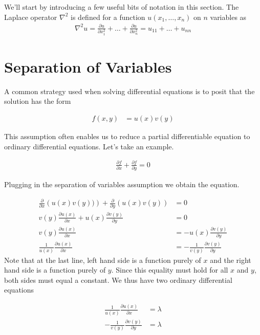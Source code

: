 \documentclass[book.tex]{subfiles}
\begin{document}
We'll start by introducing a few useful bits of notation in this section. The Laplace operator $\nabla^2$ is defined for a function $u(x_1, \dotsc, x_n)$ on $n$ variables as
\begin{align}
    \nabla^2 u = \frac{\partial u}{\partial x_1^2} + \dotsc + \frac{\partial u}{\partial x_n^2} = u_{11} + \dotsc + u_{nn}
\end{align}




\section{Separation of Variables}

A common strategy used when solving differential equations is to posit that the solution has the form

\begin{align}
    f(x, y) &= u(x)v(y)
\end{align}

This assumption often enables us to reduce a partial differentiable equation to ordinary differential equations. Let's take an example.

\begin{align}
    \frac{\partial f}{\partial x} + \frac{\partial f}{\partial y} = 0
\end{align}

Plugging in the separation of variables assumption we obtain the equation.

\begin{align}
    \frac{\partial}{\partial x} \left ( u(x) v(y)) \right ) + \frac{\partial}{\partial y} \left ( u(x) v(y) \right) &= 0 \\
    v(y)\frac{\partial u(x)}{\partial x} + u(x) \frac{\partial v(y)}{\partial y} &= 0 \\
    v(y) \frac{\partial u(x)}{\partial x} &= - u(x) \frac{\partial v(y)}{\partial y} \\
    \frac{1}{u(x)}\frac{\partial u(x)}{\partial x} &= -\frac{1}{v(y)}\frac{\partial v(y)}{\partial y} 
\end{align}
Note that at the last line, left hand side is a function purely of $x$ and the right hand side is a function purely of $y$. Since this equality must hold for all $x$ and $y$, both sides must equal a constant. We thus have two ordinary differential equations

\begin{align}
  \frac{1}{u(x)}\frac{\partial u(x)}{\partial x} &= \lambda \\ -\frac{1}{v(y)}\frac{\partial v(y)}{\partial y}  &= \lambda \\
\end{align}
\end{document}
